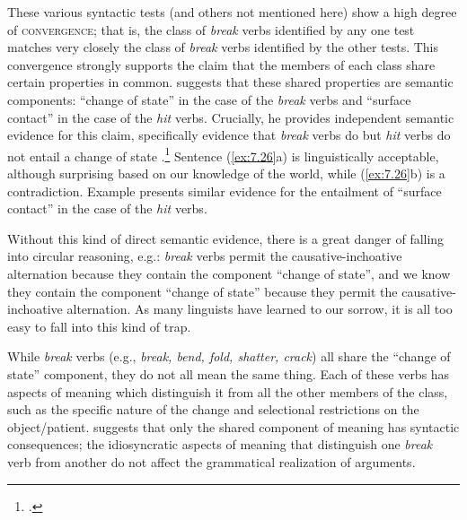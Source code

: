 \ea \label{ex:7.25}
                       \z
\z


These various syntactic tests (and others not mentioned here) show a high degree of \textsc{convergence}; that is, the class of \textit{break} verbs identified by any one test matches very closely the class of \textit{break} verbs identified by the other tests. This convergence strongly supports the claim that the members of each class share certain properties in common. \citet[125]{Fillmore1970} suggests that these shared properties are semantic components: “change of state” in the case of the \textit{break} verbs and “surface contact” in the case of the \textit{hit} verbs. Crucially, he provides independent semantic evidence for this claim, specifically evidence that \textit{break} verbs do but \textit{hit} verbs do not entail a change of state .\footnote{\citet[125]{Fillmore1970}.} Sentence (\ref{ex:7.26}a) is linguistically acceptable, although surprising based on our knowledge of the world, while (\ref{ex:7.26}b) is a contradiction. Example  presents similar evidence for the entailment of “surface contact” in the case of the \textit{hit} verbs.
 
\ea \label{ex:7.26}
                       \z
\z

\ea \label{ex:7.27}
                       \z
\z


Without this kind of direct semantic evidence, there is a great danger of falling into circular reasoning, e.g.: \textit{break} verbs permit the causative-inchoative alternation because they contain the component “change of state”, and we know they contain the component “change of state” because they permit the causative-inchoative alternation. As many linguists have learned to our sorrow, it is all too easy to fall into this kind of trap.



While \textit{break} verbs (e.g., \textit{break, bend, fold, shatter, crack}) all share the “change of state” component, they do not all mean the same thing. Each of these verbs has aspects of meaning which distinguish it from all the other members of the class, such as the specific nature of the change and selectional restrictions on the object/patient. \citet[131]{Fillmore1970} suggests that only the shared component of meaning has syntactic consequences; the idiosyncratic aspects of meaning that distinguish one \textit{break} verb from another do not affect the grammatical realization of arguments.



